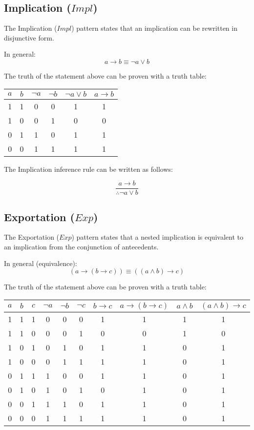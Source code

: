 \documentclass[12pt,a4paper,openany]{article}
\begin{document}
\subsection{Implication (\(Impl\))}\label{implication-impl}

The Implication (\(Impl\)) pattern states that an implication can be rewritten in disjunctive form.

In general:
\[a \rightarrow b \equiv \lnot a \lor b\]

The truth of the statement above can be proven with a truth table:

\begin{center}
\begin{tabular}{|c|c|c|c|c|c|}
\hline
\(a\) & \(b\) & \(\neg a\) & \(\neg b\) & \(\neg a \lor b\) & \(a \rightarrow b\) \\
\hline
1 & 1 & 0 & 0 & 1 & 1 \\
1 & 0 & 0 & 1 & 0 & 0 \\
0 & 1 & 1 & 0 & 1 & 1 \\
0 & 0 & 1 & 1 & 1 & 1 \\
\hline
\end{tabular}
\end{center}

The Implication inference rule can be written as follows:

\[
\frac{a \rightarrow b}{\therefore \lnot a \lor b}
\]

\subsection{Exportation (\(Exp\))}\label{exportation-exp}

The Exportation (\(Exp\)) pattern states that a nested implication is equivalent to an implication from the conjunction of antecedents.

In general (equivalence):
\[(a \rightarrow (b \rightarrow c)) \equiv ((a \land b) \rightarrow c)\]

The truth of the statement above can be proven with a truth table:

\begin{center}
\begin{tabular}{|c|c|c|c|c|c|c|c|c|c|}
\hline
\(a\) & \(b\) & \(c\) & \(\neg a\) & \(\neg b\) & \(\neg c\) & \(b \rightarrow c\) & \(a \rightarrow (b \rightarrow c)\) & \(a \land b\) & \((a \land b) \rightarrow c\) \\
\hline
1 & 1 & 1 & 0 & 0 & 0 & 1 & 1 & 1 & 1 \\
1 & 1 & 0 & 0 & 0 & 1 & 0 & 0 & 1 & 0 \\
1 & 0 & 1 & 0 & 1 & 0 & 1 & 1 & 0 & 1 \\
1 & 0 & 0 & 0 & 1 & 1 & 1 & 1 & 0 & 1 \\
0 & 1 & 1 & 1 & 0 & 0 & 1 & 1 & 0 & 1 \\
0 & 1 & 0 & 1 & 0 & 1 & 0 & 1 & 0 & 1 \\
0 & 0 & 1 & 1 & 1 & 0 & 1 & 1 & 0 & 1 \\
0 & 0 & 0 & 1 & 1 & 1 & 1 & 1 & 0 & 1 \\
\hline
\end{tabular}
\end{center}
\end{document}
